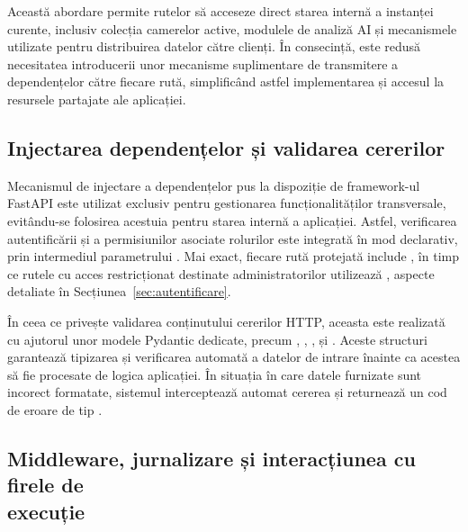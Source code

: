 \documentclass[../../main.tex]{subfiles}
\begin{document}
Această abordare permite rutelor să acceseze direct starea internă a instanței curente, inclusiv colecția camerelor active, modulele de analiză AI și mecanismele utilizate pentru distribuirea datelor către clienți. În consecință, este redusă necesitatea introducerii unor mecanisme suplimentare de transmitere a dependențelor către fiecare rută, simplificând astfel implementarea și accesul la resursele partajate ale aplicației.

\subsection{Injectarea dependențelor și validarea cererilor}

Mecanismul de injectare a dependențelor pus la dispoziție de framework-ul FastAPI este utilizat exclusiv pentru gestionarea funcționalităților transversale, evitându-se folosirea acestuia pentru starea internă a aplicației. Astfel, verificarea autentificării și a permisiunilor asociate rolurilor este integrată în mod declarativ, prin intermediul parametrului . Mai exact, fiecare rută protejată include , în timp ce rutele cu acces restricționat destinate administratorilor utilizează  \linebreak {}, aspecte detaliate în Secțiunea~\ref{sec:autentificare}.

În ceea ce privește validarea conținutului cererilor HTTP, aceasta este realizată cu ajutorul unor modele Pydantic dedicate, precum , \linebreak {}, ,  și \linebreak {}. Aceste structuri garantează tipizarea și verificarea automată a datelor de intrare înainte ca acestea să fie procesate de logica aplicației. În situația în care datele furnizate sunt incorect formatate, sistemul interceptează automat cererea și returnează un cod de eroare de tip .

\subsection{Middleware, jurnalizare și interacțiunea cu firele de \\ execuție}
\end{document}
